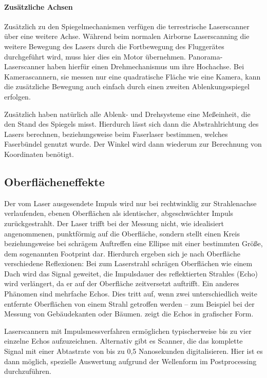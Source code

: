 \documentclass[a4paper,12pt,bibliography=totoc, listof=totoc,titlepage,pointlessnumbers]{scrreprt}
\begin{document}
\paragraph{Zusätzliche Achsen}
Zusätzlich zu den Spiegelmechanismen verfügen die terrestrische Laserscanner über eine weitere Achse. Während beim normalen Airborne Laserscanning die weitere Bewegung des Lasers durch die Fortbewegung des Fluggerätes durchgeführt wird, muss hier dies ein Motor übernehmen. Panorama-Laserscanner haben hierfür einen Drehmechanismus um ihre Hochachse. Bei Kamerascannern, sie messen nur eine quadratische Fläche wie eine Kamera, kann die zusätzliche Bewegung auch einfach durch einen zweiten Ablenkungsspiegel erfolgen. \citep[S. 37]{beraldin}

Zusätzlich haben natürlich alle Ablenk- und Drehsysteme eine Meßeinheit, die den Stand des Spiegels misst. Hierdurch lässt sich dann die Abstrahlrichtung des Lasers berechnen, beziehungsweise beim Faserlaser bestimmen, welches Faserbündel genutzt wurde. Der Winkel wird dann wiederum zur Berechnung von Koordinaten benötigt.


\subsection{Oberflächeneffekte}
Der vom Laser ausgesendete Impuls wird nur bei rechtwinklig zur Strahlenachse verlaufenden, ebenen Oberflächen als identischer, abgeschwächter Impuls zurückgestrahlt. Der Laser trifft bei der Messung nicht, wie idealisiert angenommenen, punktförmig auf die Oberfläche, sondern stellt einen Kreis beziehungsweise bei schrägem Auftreffen eine Ellipse mit einer bestimmten Größe, dem sogenannten Footprint dar. Hierdurch ergeben sich je nach Oberfläche verschiedene Reflexionen: Bei zum Laserstrahl schrägen Oberflächen wie einem Dach wird das Signal geweitet, die Impulsdauer des reflektierten Strahles (Echo) wird verlängert, da er auf der Oberfläche zeitversetzt auftrifft. Ein anderes Phänomen sind mehrfache Echos. Dies tritt auf, wenn zwei unterschiedlich weite entfernte Oberflächen von einem Strahl getroffen werden -- zum Beispiel bei der Messung von Gebäudekanten oder Bäumen.  zeigt die Echos in grafischer Form. \citep[S. 28]{beraldin}


Laserscannern mit Impulsmessverfahren ermöglichen typischerweise bis zu vier einzelne Echos aufzuzeichnen. Alternativ gibt es Scanner, die das komplette Signal mit einer Abtastrate von bis zu 0,5 Nanosekunden digitalisieren. Hier ist es dann möglich, spezielle Auswertung aufgrund der Wellenform im Postprocessing durchzuführen. \citep[S. 29]{beraldin}
\end{document}
